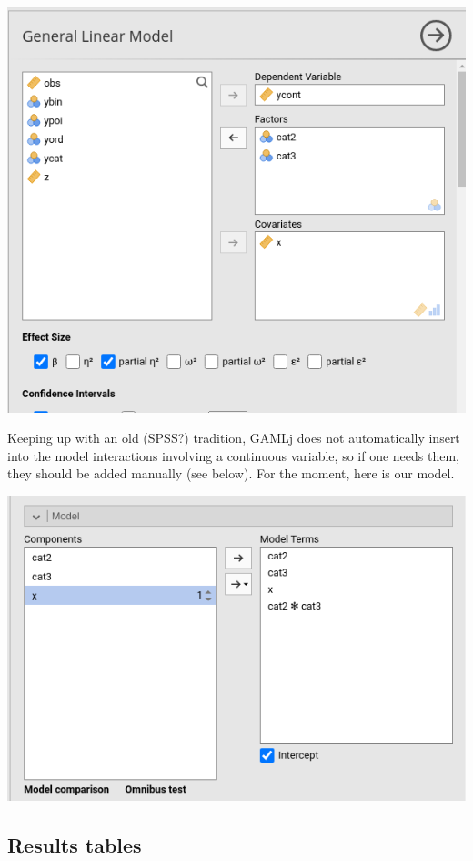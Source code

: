 \documentclass[
]{book}
\begin{document}
\includegraphics{bookletpics/2_ancova_input1.png}

Keeping up with an old (SPSS?) tradition, {GAMLj} does not automatically insert into the model interactions involving a continuous variable, so if one needs them, they should be added manually (see below). For the moment, here is our model.

\includegraphics{bookletpics/2_ancova_input2.png}

\hypertarget{results-tables}{%
\subsection{Results tables}\label{results-tables}}
\end{document}

